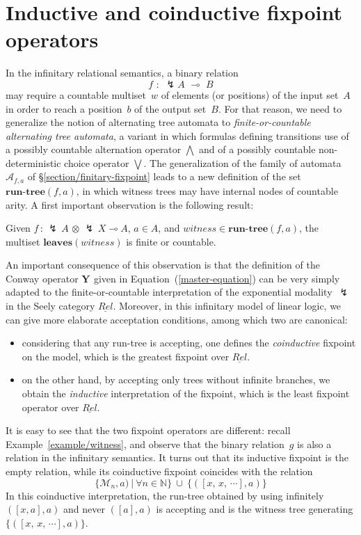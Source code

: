 \documentclass[runningheads,a4paper]{llncs}
\newcommand{\superbang}{\lightning} \newcommand{\modality}{\Box}
\newcommand{\Relinfinitary}{\underline{Rel}}
\newcommand{\runtree}[2]{\textbf{run-tree}(#1,#2)}
\newcommand{\tree}{\textit{witness}}
\newcommand{\leaves}[1]{\textbf{leaves}(#1)}
\newcommand{\fixpoint}[1]{\textbf{Y}_{#1}}
\begin{document}
\section{Inductive and coinductive fixpoint operators}\label{section/inductive-and-coinductive}
In the infinitary relational semantics, a binary relation 
$$f\,\,:\,\,\superbang A \, \, \multimap \, \, B$$
may require a countable multiset~$w$ of elements (or positions) of the input set~$A$
in order to reach a position~$b$ of the output set~$B$. 
For that reason, we need to generalize the notion of alternating tree automata to \emph{finite-or-countable alternating tree automata}, 
a variant in which formulas defining transitions use of a possibly countable alternation operator $\bigwedge$ 
and of a possibly countable non-deterministic choice operator $\bigvee$.
The generalization of the family of automata $\mathcal{A}_{f,a}$ of \S\ref{section/finitary-fixpoint} leads to a new definition of the set $\runtree{f}{a}$, in which witness trees may have internal nodes of countable arity.
A first important observation is the following result:

\begin{property}
Given $f\,:\,\superbang\, A \, \otimes \, \superbang \,X \multimap A$, $a \in A$, and $\tree \in \runtree{f}{a}$, the multiset $\leaves{\tree}$ is finite or countable.
\end{property}
An important consequence of this observation is that the definition of the Conway operator $\fixpoint{}$ given in Equation~(\ref{master-equation}) 
can be very simply adapted to the finite-or-countable interpretation of the exponential modality~$\superbang$ in the Seely category $\Relinfinitary$.
Moreover, in this infinitary model of linear logic, we can give more elaborate acceptation conditions, among which two are canonical:
\begin{itemize}
\item considering that any run-tree is accepting, one defines the \emph{coinductive} fixpoint on the model, which is the greatest fixpoint over $\Relinfinitary$.
\item on the other hand, by accepting only trees without infinite branches, we obtain the \emph{inductive} interpretation of the fixpoint,
which is the least fixpoint operator over $\Relinfinitary$.
\end{itemize}

It is easy to see that the two fixpoint operators are different: recall Example~\ref{example/witness},
and observe that the binary relation~$g$ is also a relation in the infinitary semantics.
It turns out that its inductive fixpoint is the empty relation, while its coinductive fixpoint coincides with the relation
$$
\{\mathcal{M}_n,a) \ \vert \ \forall n \in \mathbb{N}\}\ \cup\ \{([x,\,x,\,\cdots],a)\}
$$
In this coinductive interpretation, the run-tree obtained by using infinitely $([x,a],a)$ and never $([a],a)$ is accepting and is the witness tree generating $\{([x,\,x,\,\cdots],a)\}$.
\end{document}

